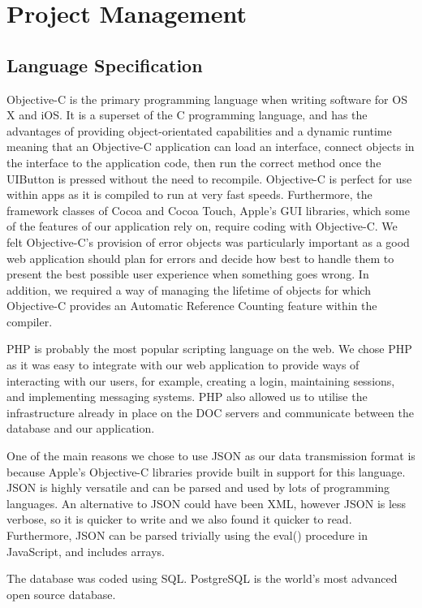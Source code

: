 \documentclass[a4wide, 10pt]{article}
\begin{document}
\section{Project Management}

\subsection{Language Specification}
Objective-C is the primary programming language when writing software for OS X and iOS. It is a superset of the C programming language, and has the advantages of providing object-orientated capabilities and a dynamic runtime meaning that an Objective-C application can load an interface, connect objects in the interface to the application code, then run the correct method once the UIButton is pressed without the need to recompile. Objective-C is perfect for use within apps as it is compiled to run at very fast speeds. Furthermore, the framework classes of Cocoa and Cocoa Touch, Apple's GUI libraries, which some of the features of our application rely on, require coding with Objective-C. We felt Objective-C's provision of error objects was particularly important as a good web application should plan for errors and decide how best to handle them to present the best possible user experience when something goes wrong. In addition, we required a way of managing the lifetime of objects for which Objective-C provides an Automatic Reference Counting feature within the compiler.

PHP is probably the most popular scripting language on the web. We chose PHP as it was easy to integrate with our web application to provide ways of interacting with our users, for example, creating a login, maintaining sessions, and implementing messaging systems. PHP also allowed us to utilise the infrastructure already in place on the DOC servers and communicate between the database and our application. 
 
One of the main reasons we chose to use JSON as our data transmission format is because Apple's Objective-C libraries provide built in support for this language. JSON is highly versatile and can be parsed and used by lots of programming languages. An alternative to JSON could have been XML, however JSON is less verbose, so it is quicker to write and we also found it quicker to read. Furthermore, JSON can be parsed trivially using the eval() procedure in JavaScript, and includes arrays. 

The database was coded using SQL. PostgreSQL is the world's most advanced open source database.
\end{document}
